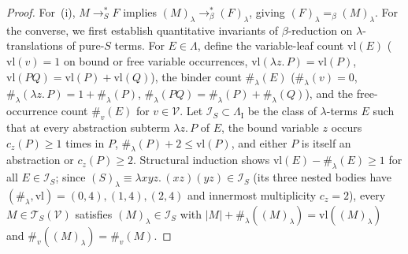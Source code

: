 \documentclass[11pt,reqno]{amsart}
\numberwithin{equation}{section}
\theoremstyle{plain}
\theoremstyle{definition}
\theoremstyle{remark}
\newcommand{\TSV}{\mathcal{T}_S(\mathcal{V})}
\newcommand{\redSs}{\to_S^*}
\begin{document}
\begin{proof}
For~(i), $M \redSs F$ implies $(M)_\lambda \to_\beta^* (F)_\lambda$, giving $(F)_\lambda =_\beta (M)_\lambda$. For the converse, we first establish quantitative invariants of $\beta$-reduction on $\lambda$-translations of pure-$S$ terms. For $E \in \Lambda$, define the variable-leaf count $\mathrm{vl}(E)$ ($\mathrm{vl}(v) = 1$ on bound or free variable occurrences, $\mathrm{vl}(\lambda z.\, P) = \mathrm{vl}(P)$, $\mathrm{vl}(P Q) = \mathrm{vl}(P) + \mathrm{vl}(Q)$), the binder count $\#_\lambda(E)$ ($\#_\lambda(v) = 0$, $\#_\lambda(\lambda z.\, P) = 1 + \#_\lambda(P)$, $\#_\lambda(P Q) = \#_\lambda(P) + \#_\lambda(Q)$), and the free-occurrence count $\#_v(E)$ for $v \in \mathcal{V}$. Let $\mathcal{I}_S \subset \Lambda_{\mathrm{I}}$ be the class of $\lambda$-terms $E$ such that at every abstraction subterm $\lambda z.\, P$ of $E$, the bound variable $z$ occurs $c_z(P) \ge 1$ times in $P$, $\#_\lambda(P) + 2 \le \mathrm{vl}(P)$, and either $P$ is itself an abstraction or $c_z(P) \ge 2$. Structural induction shows $\mathrm{vl}(E) - \#_\lambda(E) \ge 1$ for all $E \in \mathcal{I}_S$; since $(S)_\lambda \equiv \lambda x y z.\, (x z)(y z) \in \mathcal{I}_S$ (its three nested bodies have $(\#_\lambda, \mathrm{vl}) = (0, 4), (1, 4), (2, 4)$ and innermost multiplicity $c_z = 2$), every $M \in \TSV$ satisfies $(M)_\lambda \in \mathcal{I}_S$ with $|M| + \#_\lambda((M)_\lambda) = \mathrm{vl}((M)_\lambda)$ and $\#_v((M)_\lambda) = \#_v(M)$.


\end{proof}
\end{document}
